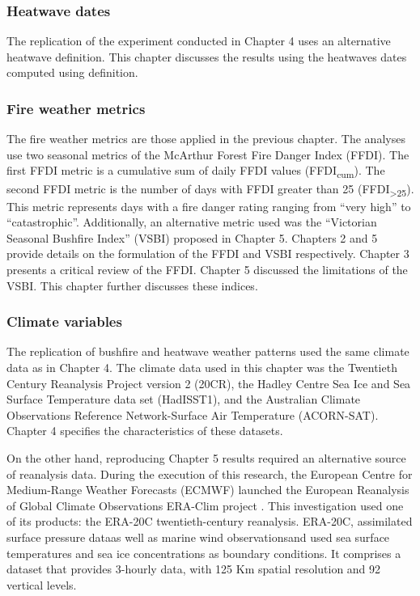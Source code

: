 \subsubsection{Heatwave dates}

The replication of the experiment conducted in Chapter 4 uses an alternative
heatwave definition. This chapter discusses the results using the
heatwaves dates computed using \citet{Pezza2012} definition. 


\subsubsection{Fire weather metrics}

The fire weather metrics are those applied in the previous chapter.
The analyses use two seasonal metrics of the McArthur Forest Fire
Danger Index (FFDI). The first FFDI metric is a cumulative sum of
daily FFDI values (FFDI\textsubscript{cum}). The second FFDI metric
is the number of days with FFDI greater than 25 (FFDI\textsubscript{>25}).
This metric represents days with a fire danger rating ranging from
``very high'' to ``catastrophic''. Additionally, an alternative
metric used was the ``Victorian Seasonal Bushfire Index'' (VSBI)
proposed in Chapter 5. Chapters 2 and 5 provide details on the formulation
of the FFDI and VSBI respectively. Chapter 3 presents a critical review
of the FFDI. Chapter 5 discussed the limitations of the VSBI. This
chapter further discusses these indices.


\subsubsection{Climate variables}

The replication of bushfire and heatwave weather patterns used the
same climate data as in Chapter 4. The climate data used in this chapter
was the Twentieth Century Reanalysis Project version 2 (20CR), the
Hadley Centre Sea Ice and Sea Surface Temperature data set (HadISST1),
and the Australian Climate Observations Reference Network-Surface
Air Temperature (ACORN-SAT). Chapter 4 specifies the characteristics
of these datasets. 

On the other hand, reproducing Chapter 5 results required an alternative
source of reanalysis data. During the execution of this research,
the European Centre for Medium-Range Weather Forecasts (ECMWF) launched
the European Reanalysis of Global Climate Observations ERA-Clim project
\citep{Stickler2014,Stickler2014a}. This investigation used one of
its products: the ERA-20C twentieth-century reanalysis. ERA-20C, assimilated
surface pressure data\textemdash as well as marine wind observations\textemdash and
used sea surface temperatures and sea ice concentrations as boundary
conditions. It comprises a dataset that provides 3-hourly data, with
125 Km spatial resolution and 92 vertical levels. 

